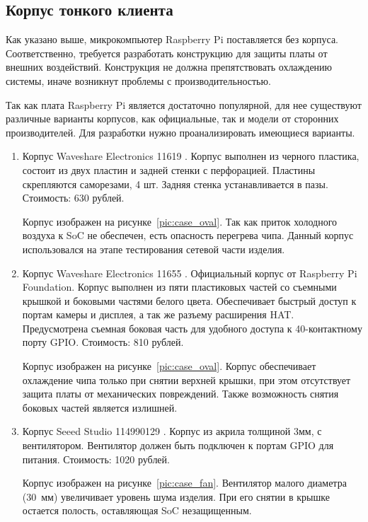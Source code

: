 \subsection{Корпус тонкого клиента}

Как указано выше, микрокомпьютер Raspberry Pi поставляется без корпуса. Соответственно,
требуется разработать конструкцию для защиты платы от внешних воздействий. Конструкция
не должна препятствовать охлаждению системы, иначе возникнут проблемы с
производительностью.

Так как плата Raspberry Pi является достаточно популярной, для нее существуют различные
варианты корпусов, как официальные, так и модели от сторонних производителей. Для
разработки нужно проанализировать имеющиеся варианты.

\begin{enumerate}
    \item Корпус Waveshare Electronics 11619 \cite{ref:case_oval}. Корпус выполнен из
        черного пластика, состоит из двух пластин и задней стенки с перфорацией.
        Пластины скрепляются саморезами, 4 шт. Задняя стенка устанавливается в пазы.
        Стоимость: 630 рублей.

        Корпус изображен на рисунке~\ref{pic:case_oval}.
        Так как приток холодного воздуха к SoC не обеспечен, есть опасность перегрева
        чипа. Данный корпус использовался на этапе тестирования сетевой части изделия.

    \item Корпус Waveshare Electronics 11655 \cite{ref:case_off}. Официальный корпус от
        Raspberry Pi Foundation. Корпус выполнен из пяти пластиковых частей со съемными
        крышкой и боковыми частями белого цвета.  Обеспечивает быстрый доступ к портам
        камеры и дисплея, а так же разъему расширения HAT. Предусмотрена съемная боковая
        часть для удобного доступа к 40-контактному порту GPIO.
        Стоимость: 810 рублей.

        Корпус изображен на рисунке~\ref{pic:case_oval}.
        Корпус обеспечивает охлаждение чипа только при снятии верхней крышки, при этом
        отсутствует защита платы от механических повреждений. Также возможность снятия
        боковых частей является излишней.
        
    \item Корпус Seeed Studio 114990129 \cite{ref:case_fan}.
        Корпус из акрила толщиной 3мм, с вентилятором. Вентилятор должен быть подключен
        к портам GPIO для питания.
        Стоимость: 1020 рублей.

        Корпус изображен на рисунке~\ref{pic:case_fan}.
        Вентилятор малого диаметра (30~мм) увеличивает уровень шума изделия. При его
        снятии в крышке остается полость, оставляющая SoC незащищенным.
\end{enumerate}

